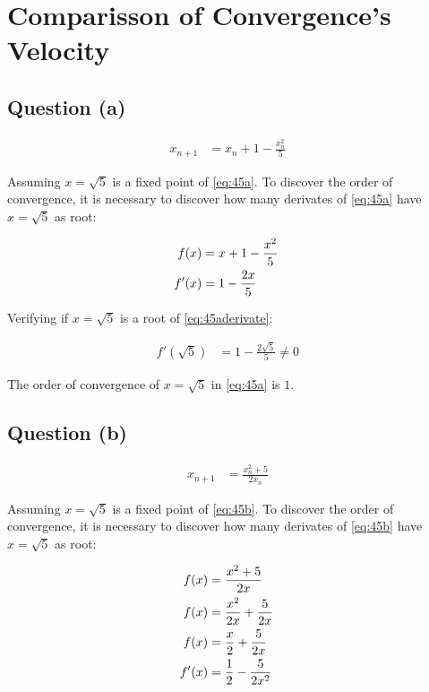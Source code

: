 \section{Comparisson of Convergence's Velocity}

	\subsection{Question (a)}
		\begin{align}
			x_{n+1} &= x_{n}+1-\frac{x_{n}^{2}}{5}&
		\label{eq:45a}
		\end{align}

		Assuming $x= \sqrt{5}$ is a fixed point of \cref{eq:45a}. To discover the order of convergence, it is necessary to discover how many derivates of \cref{eq:45a} have $x=\sqrt{5}$ as root:

		\begin{align}
			f(x) &= x+1-\frac{x^{2}}{5}& \notag \\
			f'(x) &= 1 - \frac{2x}{5}&
		\label{eq:45aderivate}
		\end{align}	

		Verifying if $x=\sqrt{5}$ is a root of \cref{eq:45aderivate}:

		\begin{align}
			f'(\sqrt{5}) &= 1 - \frac{2\sqrt{5}}{5} \neq 0&
		\label{eq:45aderivatesqrt5x}
		\end{align}
		
		The order of convergence of $x = \sqrt{5}$ in \cref{eq:45a} is $1$.

	\subsection{Question (b)}
		\begin{align}
			x_{n+1} &= \frac{x_{n}^{2}+5}{2x_{n}}&
		\label{eq:45b}
		\end{align}

		Assuming $x= \sqrt{5}$ is a fixed point of \cref{eq:45b}. To discover the order of convergence, it is necessary to discover how many derivates of \cref{eq:45b} have $x=\sqrt{5}$ as root:

		\begin{align}
			f(x) &= \frac{x^{2}+5}{2x}& \notag \\
			f(x) &= \frac{x^{2}}{2x} + \frac{5}{2x}& \notag \\
			f(x) &= \frac{x}{2} + \frac{5}{2x}& \notag \\
			f'(x) &= \frac{1}{2} - \frac{5}{2x^2}&
		\label{eq:45bderivate}
		\end{align}

